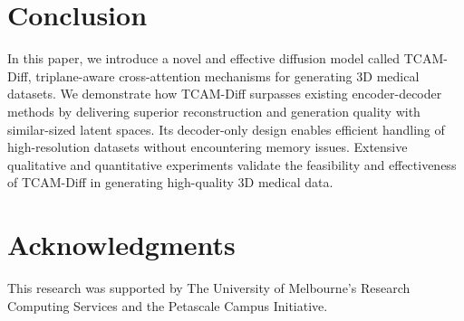 \documentclass[letterpaper]{article} %
\begin{document}
\section{Conclusion}
In this paper, we introduce a novel and effective diffusion model called TCAM-Diff, triplane-aware cross-attention mechanisms for generating 3D medical datasets. We demonstrate how TCAM-Diff surpasses existing encoder-decoder methods by delivering superior reconstruction and generation quality with similar-sized latent spaces. Its decoder-only design enables efficient handling of high-resolution datasets without encountering memory issues. Extensive qualitative and quantitative experiments validate the feasibility and effectiveness of TCAM-Diff in generating high-quality 3D medical data. 

\section{Acknowledgments}
This research was supported by The University of Melbourne’s Research Computing Services and the Petascale Campus Initiative.


\end{document}
